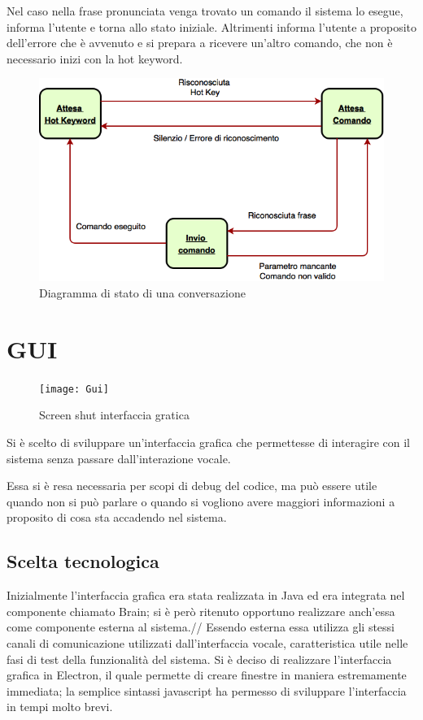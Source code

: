 \documentclass[twoside]{supsistudent}
\begin{document}
Nel caso nella frase pronunciata venga trovato un comando il sistema lo esegue, informa l'utente e torna allo stato iniziale.
Altrimenti informa l'utente a proposito dell'errore che è avvenuto e si prepara a ricevere un'altro comando, che non è necessario inizi con la hot keyword.
\begin{figure}[H]
\centering
\includegraphics[width=\textwidth]{Conversation}
\caption{Diagramma di stato di una conversazione}
\label{fig:pose}
\end{figure}
\chapter{GUI}
\begin{figure}[H]
\centering
\texttt{[image: Gui]}
\caption{Screen shut interfaccia gratica}
\label{fig:pose}
\end{figure}
Si è scelto di sviluppare un'interfaccia grafica che permettesse di interagire con il sistema senza passare dall'interazione vocale.

Essa si è resa necessaria per scopi di debug del codice, ma può essere utile quando non si può parlare o quando si vogliono avere maggiori informazioni a proposito di cosa sta accadendo nel sistema.
\section{Scelta tecnologica}
Inizialmente l'interfaccia grafica era stata realizzata in Java ed era integrata nel componente chiamato Brain; si è però ritenuto opportuno realizzare anch'essa come componente esterna al sistema.//
Essendo esterna essa utilizza gli stessi canali di comunicazione utilizzati dall'interfaccia vocale, caratteristica utile nelle fasi di test della funzionalità del sistema.
Si è deciso di realizzare l'interfaccia grafica in Electron, il quale permette di creare finestre in maniera estremamente immediata; la semplice sintassi javascript ha permesso di sviluppare l'interfaccia in tempi molto brevi. \cite{electron}
\end{document}
